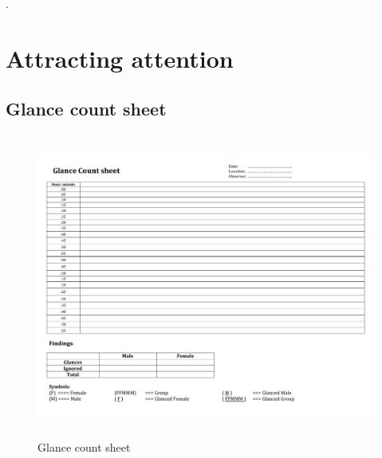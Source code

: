 
\begin{appendices}

\makeatletter
{}
\makeatother


\newpage
.

\chapter{Attracting attention}

\section{Glance count sheet}

\begin{figure}[H]
 \centering 
    \includegraphics[width=\textwidth,height=100mm]{Appendices/3/Glance_Count_Method.pdf}
    \caption{Glance count sheet}
     \label{app:Glance_Count_Method}%
\end{figure}



\end{appendices}
